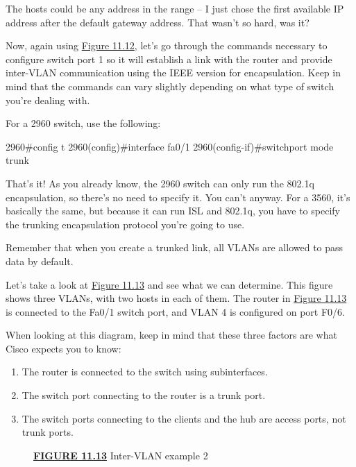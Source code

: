 The hosts could be any address in the range -- I just chose the first
available IP address after the default gateway address. That wasn't so
hard, was it?

Now, again using \protect\hyperlink{c11.xhtmlux5cux23figure11-12}{Figure
11.12}, let's go through the commands necessary to configure switch port
1 so it will establish a link with the router and provide inter-VLAN
communication using the IEEE version for encapsulation. Keep in mind
that the commands can vary slightly depending on what type of switch
you're dealing with.

For a 2960 switch, use the following:

\begin{cli}
2960#config t
2960(config)#interface fa0/1
2960(config-if)#switchport mode trunk
\end{cli}

That's it! As you
already know, the 2960 switch can only run the 802.1q encapsulation, so
there's no need to specify it. You can't anyway. For a 3560, it's
basically the same, but because it can run ISL and 802.1q, you have to
specify the trunking encapsulation protocol you're going to use.

\begin{note}
Remember that when you create a trunked link, all VLANs are allowed to pass data by default.
\end{note}

Let's take a look at
\protect\hyperlink{c11.xhtmlux5cux23figure11-13}{Figure 11.13} and see
what we can determine. This figure shows three VLANs, with two hosts in
each of them. The router in
\protect\hyperlink{c11.xhtmlux5cux23figure11-13}{Figure 11.13} is
connected to the Fa0/1 switch port, and VLAN 4 is configured on port
F0/6.

When looking at this diagram, keep in mind that these three factors are what Cisco expects you to know:

\begin{enumerate}
\item
  The router is connected to the switch using subinterfaces.
\item
  The switch port connecting to the router is a trunk port.
\item
  The switch ports connecting to the clients and the hub are access
  ports, not trunk ports.
\end{enumerate}

\begin{figure}
\centering
\caption{{\protect\hyperlink{c11.xhtmlux5cux23figureanchor11-13}{\textbf{FIGURE
11.13}} Inter-VLAN example 2}}
\end{figure}

